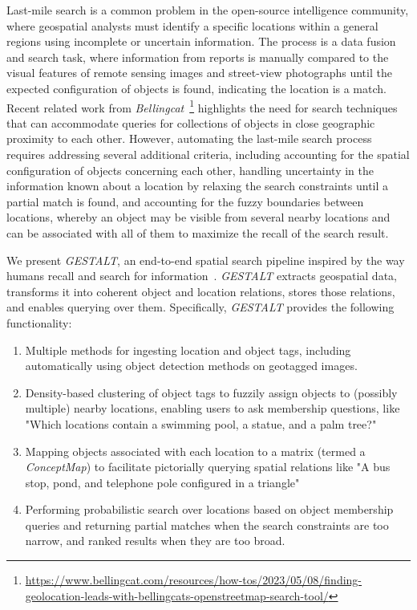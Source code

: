 Last-mile search is a common problem in the open-source intelligence community, where geospatial analysts must identify a specific locations within a general regions using incomplete or uncertain information. 
The process is a data fusion and search task, where information from reports is manually compared to the visual features of remote sensing images and street-view photographs until the expected configuration of objects is found, indicating the location is a match.
Recent related work from \textit{Bellingcat}~\footnote{\href{https://www.bellingcat.com/resources/how-tos/2023/05/08/finding-geolocation-leads-with-bellingcats-openstreetmap-search-tool/}{https://www.bellingcat.com/resources/how-tos/2023/05/08/finding-geolocation-leads-with-bellingcats-openstreetmap-search-tool/}} highlights the need for search techniques that can accommodate queries for collections of objects in close geographic proximity to each other.
However, automating the last-mile search process requires addressing several additional criteria, including accounting for the spatial configuration of objects concerning each other, handling uncertainty in the information known about a location by relaxing the search constraints until a partial match is found, and accounting for the fuzzy boundaries between locations, whereby an object may be visible from several nearby locations and can be associated with all of them to maximize the recall of the search result.

We present \emph{GESTALT}, an end-to-end spatial search pipeline inspired by the way humans recall and search for information~\cite{Helbing2020, Oliveira2016, Weisberg2016}.
\emph{GESTALT} extracts geospatial data, transforms it into coherent object and location relations, stores those relations, and enables querying over them. 
Specifically, \emph{GESTALT} provides the following functionality:
\begin{enumerate}
    \item Multiple methods for ingesting location and object tags, including automatically using object detection methods on geotagged images.
    \item Density-based clustering of object tags to fuzzily assign objects to (possibly multiple) nearby locations, enabling users to ask membership questions, like "Which locations contain a swimming pool, a statue, and a palm tree?"
    \item Mapping objects associated with each location to a matrix (termed a \emph{ConceptMap}) to facilitate pictorially querying spatial relations like "A bus stop, pond, and telephone pole configured in a triangle"
    \item Performing probabilistic search over locations based on object membership queries and returning partial matches when the search constraints are too narrow, and ranked results when they are too broad.
\end{enumerate}

